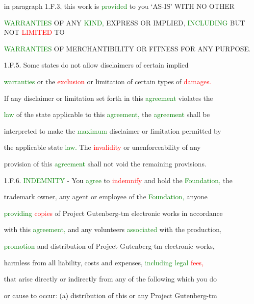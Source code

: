  in paragraph 1.F.3, this work is \textcolor{green}{provided} to you ‘AS-IS’ WITH NO OTHER

 \textcolor{green}{WARRANTIES} OF ANY \textcolor{green}{KIND,} EXPRESS OR IMPLIED, \textcolor{green}{INCLUDING} BUT NOT \textcolor{red}{LIMITED} TO

 \textcolor{green}{WARRANTIES} OF MERCHANTIBILITY OR FITNESS FOR ANY PURPOSE.



 1.F.5. Some states do not allow disclaimers of certain implied

 \textcolor{green}{warranties} or the \textcolor{red}{exclusion} or limitation of certain types of \textcolor{red}{damages.}

 If any disclaimer or limitation set forth in this \textcolor{green}{agreement} violates the

 \textcolor{green}{law} of the state applicable to this \textcolor{green}{agreement,} the \textcolor{green}{agreement} shall be

 interpreted to make the \textcolor{green}{maximum} disclaimer or limitation permitted by

 the applicable state \textcolor{green}{law.} The \textcolor{red}{invalidity} or unenforceability of any

 provision of this \textcolor{green}{agreement} shall not void the remaining provisions.



 1.F.6. \textcolor{green}{INDEMNITY} - You \textcolor{green}{agree} to \textcolor{red}{indemnify} and hold the \textcolor{green}{Foundation,} the

 trademark owner, any agent or employee of the \textcolor{green}{Foundation,} anyone

 \textcolor{green}{providing} \textcolor{red}{copies} of Project Gutenberg-tm electronic works in accordance

 with this \textcolor{green}{agreement,} and any \textcolor{BurntOrange}{volunteers} \textcolor{green}{associated} with the \textcolor{BurntOrange}{production,}

 \textcolor{green}{promotion} and distribution of Project Gutenberg-tm electronic works,

 harmless from all liability, costs and expenses, \textcolor{green}{including} \textcolor{green}{legal} \textcolor{red}{fees,}

 that arise directly or indirectly from any of the following which you do

 or cause to occur: (a) distribution of this or any Project Gutenberg-tm

